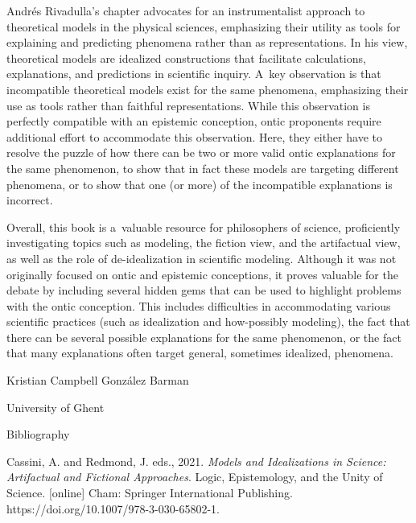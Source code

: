 Andrés Rivadulla's chapter advocates for an instrumentalist approach to theoretical models in the physical sciences, emphasizing their utility as tools for explaining and predicting phenomena rather than as representations. In his view, theoretical models are idealized constructions that facilitate calculations, explanations, and predictions in scientific inquiry. A~key observation is that incompatible theoretical models exist for the same phenomena, emphasizing their use as tools rather than faithful representations. While this observation is perfectly compatible with an epistemic conception, ontic proponents require additional effort to accommodate this observation. Here, they either have to resolve the puzzle of how there can be two or more valid ontic explanations for the same phenomenon, to show that in fact these models are targeting different phenomena, or to show that one (or more) of the incompatible explanations is incorrect.

Overall, this book is a~valuable resource for philosophers of science, proficiently investigating topics such as modeling, the fiction view, and the artifactual view, as well as the role of de-idealization in scientific modeling. Although it was not originally focused on ontic and epistemic conceptions, it proves valuable for the debate by including several hidden gems that can be used to highlight problems with the ontic conception. This includes difficulties in accommodating various scientific practices (such as idealization and how-possibly modeling), the fact that there can be several possible explanations for the same phenomenon, or the fact that many explanations often target general, sometimes idealized, phenomena.

Kristian Campbell González Barman

University of Ghent

Bibliography

Cassini, A. and Redmond, J. eds., 2021. \textit{Models and Idealizations in Science: Artifactual and Fictional Approaches}. Logic, Epistemology, and the Unity of Science. [online] Cham: Springer International Publishing. https://doi.org/10.1007/978-3-030-65802-1.


